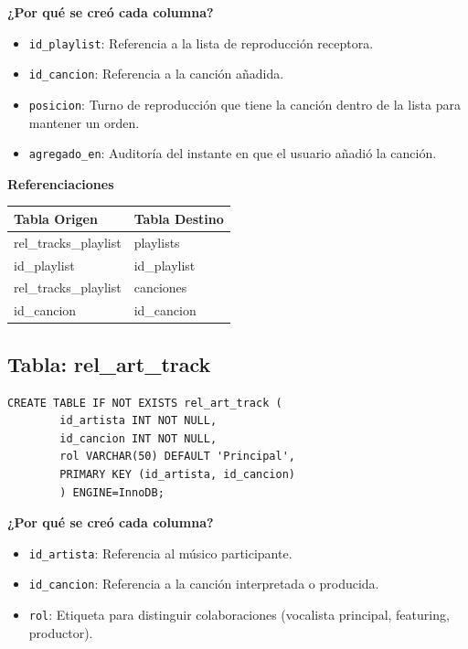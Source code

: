 \documentclass[11pt]{article}
\begin{document}
	\noindent\textbf{¿Por qué se creó cada columna?}
	\begin{itemize}[noitemsep,topsep=2pt]
		\item \texttt{id\_playlist}: Referencia a la lista de reproducción receptora.
		\item \texttt{id\_cancion}: Referencia a la canción añadida.
		\item \texttt{posicion}: Turno de reproducción que tiene la canción dentro de la lista para mantener un orden.
		\item \texttt{agregado\_en}: Auditoría del instante en que el usuario añadió la canción.
	\end{itemize}
	
	\vspace{0.3cm}
	\noindent\textbf{Referenciaciones} \\[0.3em]
	\begin{tabular}{|l|l|}
		\hline
		\textbf{Tabla Origen} & \textbf{Tabla Destino} \\
		\hline
		rel\_tracks\_playlist & playlists \\
		id\_playlist & id\_playlist \\
		\hline
		rel\_tracks\_playlist & canciones \\
		id\_cancion & id\_cancion \\
		\hline
	\end{tabular}
	
	\vspace{0.5cm}
	
	\subsection{Tabla: rel\_art\_track}
	\begin{lstlisting}[style=sqlstyle]
		CREATE TABLE IF NOT EXISTS rel_art_track (
		id_artista INT NOT NULL,
		id_cancion INT NOT NULL,
		rol VARCHAR(50) DEFAULT 'Principal',
		PRIMARY KEY (id_artista, id_cancion)
		) ENGINE=InnoDB;
	\end{lstlisting}
	
	\noindent\textbf{¿Por qué se creó cada columna?}
	\begin{itemize}[noitemsep,topsep=2pt]
		\item \texttt{id\_artista}: Referencia al músico participante.
		\item \texttt{id\_cancion}: Referencia a la canción interpretada o producida.
		\item \texttt{rol}: Etiqueta para distinguir colaboraciones (vocalista principal, featuring, productor).
	\end{itemize}
	
\end{document}
